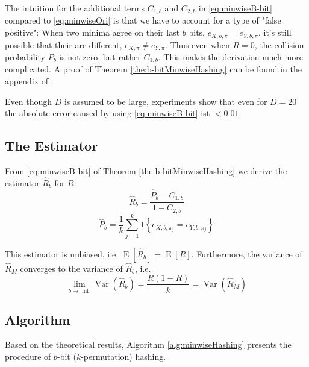 \documentclass[a4paper]{article}
\DeclareMathOperator{\Var}{Var}
\DeclareMathOperator{\E}{E}
\begin{document}
The intuition for the additional terms $C_{1,b}$ and $C_{2,b}$ in \vref{eq:minwiseB-bit} compared to \vref{eq:minwiseOri} is that we have to account for a type of "false positive": When two minima agree on their last $b$ bits, $e_{X,b,\pi}=e_{Y,b,\pi}$, it's still possible that their are different, $e_{X,\pi}\neq e_{Y,\pi}$. Thus even when $R=0$, the collision probability $P_b$ is not zero, but rather $C_{1,b}$. This makes the derivation much more complicated. A proof of Theorem \vref{the:b-bitMinwiseHashing} can be found in the appendix of \citep{LiK09}.

Even though $D$ is assumed to be large, experiments show that even for $D=20$ the absolute error caused by using \vref{eq:minwiseB-bit} ist $< 0.01$.

\subsection{The Estimator}

From \vref{eq:minwiseB-bit} of Theorem \vref{the:b-bitMinwiseHashing} we derive the estimator $\hat{R}_b$ for $R$:
\begin{equation}
\hat{R}_b=\frac{\hat{P}_b-C_{1,b}}{1-C_{2,b}}
\end{equation}
\begin{equation}
\hat{P}_b = \frac{1}{k}\sum_{j=1}^k 1 \left\lbrace  e_{X,b,\pi_j } = e_{Y,b,\pi_j } \right\rbrace
\end{equation}

This estimator is unbiased, i.e. $\E[\hat{R}_b]=\E[R]$. Furthermore, the variance of $\hat{R}_M$ converges to the variance of $\hat{R}_b$, i.e.
\begin{equation}
\lim_{b\rightarrow\inf}\Var\left(\hat{R}_b\right)=\frac{R(1-R)}{k}=\Var\left(\hat{R}_M\right)
\end{equation}

\subsection{Algorithm}

Based on the theoretical results, Algorithm \vref{alg:minwiseHashing} presents the procedure of $b$-bit ($k$-permutation) hashing.
\end{document}
